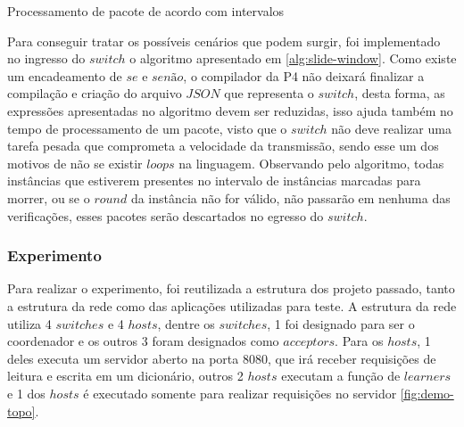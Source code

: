 \documentclass[12pt,
openright, 
oneside,
a4paper,
brazil]{facom-ufu-abntex2}
\theoremstyle{definition}
\begin{document}
\begin{algorithm}[H]
\label{alg:slide-window}
\caption{Processamento de pacote de acordo com intervalos}
\SetAlgoLined
{}
\end{algorithm}

Para conseguir tratar os possíveis cenários que podem surgir, foi implementado no ingresso do $switch$ o algoritmo
apresentado em \ref{alg:slide-window}. Como existe um encadeamento de $se$ e $senão$, o compilador da P4 não deixará
finalizar a compilação e criação do arquivo $JSON$ que representa o $switch$, desta forma, as expressões apresentadas
no algoritmo devem ser reduzidas, isso ajuda também no tempo de processamento de um pacote, visto que o $switch$
não deve realizar uma tarefa pesada que comprometa a velocidade da transmissão, sendo esse um dos motivos de não
se existir $loops$ na linguagem. Observando pelo algoritmo, todas instâncias que estiverem presentes no intervalo de 
instâncias marcadas para morrer, ou se o $round$ da instância não for válido, não passarão em nenhuma das verificações, esses 
pacotes serão descartados no egresso do $switch$.


\subsubsection{Experimento}
Para realizar o experimento, foi reutilizada a estrutura dos projeto passado, tanto a estrutura da rede como das 
aplicações utilizadas para teste. A estrutura da rede utiliza 4 $switches$ e 4 $hosts$,
dentre os $switches$, 1 foi designado para ser o coordenador e os outros 3 foram designados como $acceptors$.
Para os $hosts$, 1 deles executa um servidor aberto na porta 8080, que irá receber requisições de leitura
e escrita em um dicionário, outros 2 $hosts$ executam a função de $learners$ e 1 dos $hosts$ é executado
somente para realizar requisições no servidor \ref{fig:demo-topo}.
\end{document}
